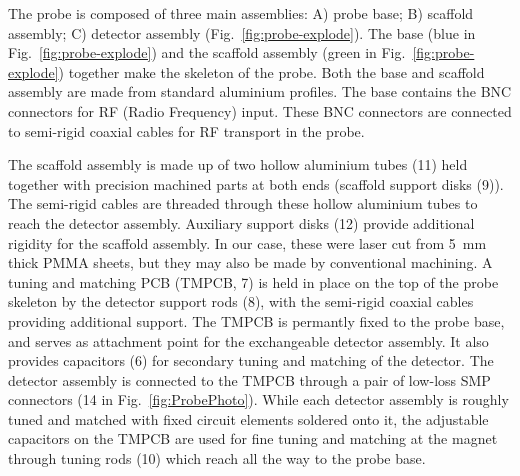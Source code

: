 \documentclass[preprint,5p]{elsarticle}
\newcommand{\fig}[1]{Fig.~\ref{#1}}
\begin{document}
The probe is composed of three main assemblies: A) probe base; B) scaffold assembly;
C) detector assembly (\fig{fig:probe-explode}).
The  base (blue in \fig{fig:probe-explode}) and the scaffold assembly
(green in \fig{fig:probe-explode}) together make the skeleton of the probe.
Both the base and scaffold assembly are made from standard aluminium profiles.
The base contains the BNC connectors for RF (Radio Frequency) input.
These BNC connectors are connected to semi-rigid coaxial cables for
RF transport in the probe.

The scaffold assembly is made up of two hollow aluminium tubes (11) held together with 
precision machined parts at both ends (scaffold support disks (9)). 
The semi-rigid cables are  threaded through these hollow aluminium tubes 
to reach the detector assembly. 
Auxiliary support disks (12) provide additional rigidity for the scaffold assembly. 
In our case, these were laser cut from 5~mm thick PMMA sheets,
but they may also be made by conventional machining.
A tuning and matching PCB (TMPCB, 7) is held in place on the top of the probe skeleton by
the detector support rods (8), with the semi-rigid coaxial cables providing
additional support.
The TMPCB is permantly fixed to the probe base, and serves as attachment point
for the exchangeable detector assembly. It also provides 
capacitors (6) for secondary tuning and matching of the detector.
The detector assembly is connected to the TMPCB through a pair of
low-loss SMP connectors (14 in \fig{fig:ProbePhoto}).
While each detector assembly is roughly
tuned and matched with fixed circuit elements soldered onto it,
the adjustable capacitors on the TMPCB are used for 
fine tuning and matching 
at the magnet through tuning rods (10) which reach all the way to the probe base.
\end{document}
